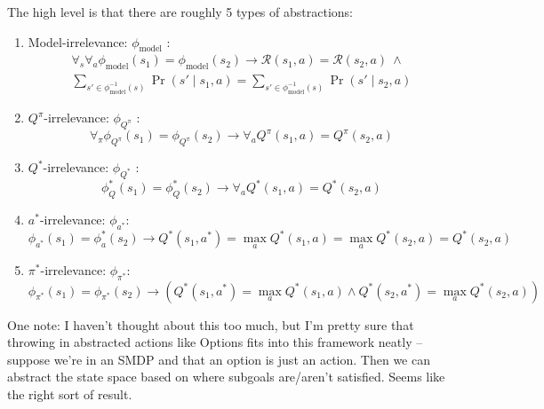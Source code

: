 \documentclass[11pt]{amsart}
\begin{document}
The high level is that there are roughly 5 types of abstractions:
\begin{enumerate}
\item Model-irrelevance: $\phi_{\text{model}}$ :
\begin{multline*}
\forall_s \forall_a \phi_{\text{model}}(s_1) = \phi_{\text{model}}(s_2) \rightarrow \mathcal{R}(s_1,a) = \mathcal{R}(s_2,a)\ \wedge \\
\sum_{s' \in \phi_{\text{model}}^{-1}(s)} \Pr(s' \mid s_1, a) = \sum_{s' \in \phi_{\text{model}}^{-1}(s)} \Pr(s' \mid s_2, a)
\end{multline*}

\item $Q^\pi$-irrelevance: $\phi_{Q^\pi}$ :
\begin{equation*}
\forall_\pi \phi_{Q^\pi}(s_1) = \phi_{Q^\pi}(s_2) \rightarrow  \forall_a Q^\pi(s_1,a) = Q^\pi(s_2,a)
\end{equation*}

\item $Q^*$-irrelevance: $\phi_{Q^*}$ :
\begin{equation*}
\phi_Q^*(s_1) = \phi_Q^*(s_2) \rightarrow \forall_a  Q^*(s_1,a) = Q^*(s_2,a)
\end{equation*}

\item $a^*$-irrelevance: $\phi_{a^*}$:
\begin{equation*}
\phi_{a^*}(s_1) = \phi_a^*(s_2) \rightarrow Q^*(s_1,a^*) = \max_a Q^*(s_1,a) = \max_a Q^*(s_2,a) = Q^*(s_2, a)
\end{equation*}

\item $\pi^*$-irrelevance: $\phi_{\pi^*}$:
\begin{equation*}
\phi_{\pi^*}(s_1) = \phi_{\pi^*}(s_2) \rightarrow \left( Q^*(s_1, a^*) = \max_a Q^*(s_1,a) \wedge Q^*(s_2,a^*) = \max_a Q^*(s_2,a) \right)
\end{equation*}

\end{enumerate}

One note: I haven't thought about this too much, but I'm pretty sure that throwing in abstracted actions like Options fits into this framework neatly -- suppose we're in an SMDP and that an option is just an action. Then we can abstract the state space based on where subgoals are/aren't satisfied. Seems like the right sort of result.
\end{document}
